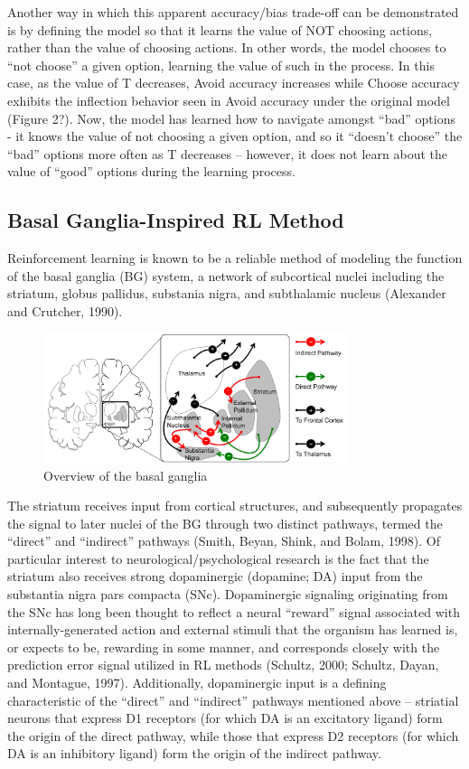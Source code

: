 \documentclass[10pt,letterpaper]{article}
\begin{document}
Another way in which this apparent accuracy/bias trade-off can be demonstrated is by defining the model so that it learns the value of NOT choosing actions, rather than the value of choosing actions. In other words, the model chooses to ``not choose'' a given option, learning the value of such in the process. In this case, as the value of T decreases, Avoid accuracy increases while Choose accuracy exhibits the inflection behavior seen in Avoid accuracy under the original model (Figure 2?). Now, the model has learned how to navigate amongst “bad” options - it knows the value of not choosing a given option, and so it “doesn’t choose” the “bad” options more often as T  decreases – however, it does not learn about the value of “good” options during the learning process.

\subsection{Basal Ganglia-Inspired RL Method}

Reinforcement learning is known to be a reliable method of modeling the function of the basal ganglia (BG) system, a network of subcortical nuclei including the striatum, globus pallidus, substania nigra, and subthalamic nucleus (Alexander and Crutcher, 1990).

\begin{figure}[ht]
	\begin{center}
		\includegraphics[width=3.5in]{basal-ganglia.png}
	\end{center}
	\caption{Overview of the basal ganglia} 
	\label{pss}
\end{figure}

The striatum receives input from cortical structures, and subsequently propagates the signal to later nuclei of the BG through two distinct pathways, termed the ``direct'' and ``indirect'' pathways (Smith, Beyan, Shink, and Bolam, 1998). Of particular interest to neurological/psychological research is the fact that the striatum also receives strong dopaminergic (dopamine; DA) input from the substantia nigra pars compacta (SNc). Dopaminergic signaling originating from the SNc has long been thought to reflect a neural “reward” signal associated with internally-generated action and external stimuli that the organism has learned is, or expects to be, rewarding in some manner, and corresponds closely with the prediction error signal utilized in RL methods (Schultz, 2000; Schultz, Dayan, and Montague, 1997). Additionally, dopaminergic input is a defining characteristic of the “direct” and “indirect” pathways mentioned above – striatial neurons that express D1 receptors (for which DA is an excitatory ligand) form the origin of the direct pathway, while those that express D2 receptors (for which DA is an inhibitory ligand) form the origin of the indirect pathway.
\end{document}
